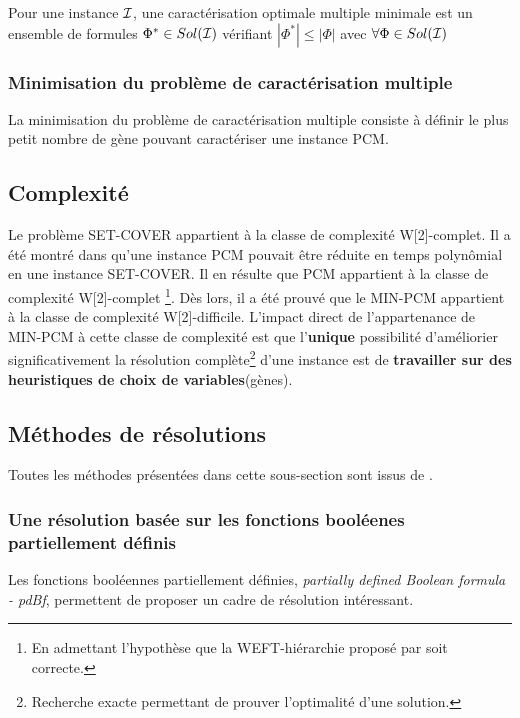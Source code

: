\begin{definition}
Pour une instance ${\cal I}$, une
caractérisation optimale multiple minimale est  un ensemble de formules
$\Phi^* \in Sol({\cal I})$ vérifiant $|\Phi^*| \leq |\Phi|$ avec $\forall \Phi
\in Sol({\cal I})$
\end{definition}

\subsubsection*{Minimisation du problème de caractérisation multiple}
La minimisation du problème de caractérisation multiple consiste à définir le plus petit nombre de gène pouvant caractériser une instance PCM.


\subsection{Complexité}
Le problème SET-COVER appartient à la classe de complexité W[2]-complet. Il a été montré dans \cite{Chhel2013} qu'une instance PCM pouvait être réduite en temps polynômial en une instance SET-COVER. Il en résulte que PCM appartient à la classe de complexité W[2]-complet \footnote{En admettant l'hypothèse que la WEFT-hiérarchie proposé par \cite{DowneyF95} soit correcte.}. Dès lors, il a été prouvé que le MIN-PCM appartient à la classe de complexité W[2]-difficile. L'impact direct de l'appartenance de MIN-PCM à cette classe de complexité est que l'\textbf{unique} possibilité d'améliorier significativement la résolution complète\footnote{Recherche exacte permettant de prouver l'optimalité d'une solution.} d'une instance est de \textbf{travailler sur des heuristiques de choix de variables}(gènes). 

\subsection{Méthodes de résolutions}
Toutes les méthodes présentées dans cette sous-section sont issus de \cite{Chhel2013}.

\subsubsection{Une résolution basée sur les fonctions booléenes partiellement définis}

Les fonctions booléennes partiellement définies, {\em partially
defined Boolean formula - pdBf},  \cite{Iba99} permettent de proposer un
cadre de résolution intéressant.

